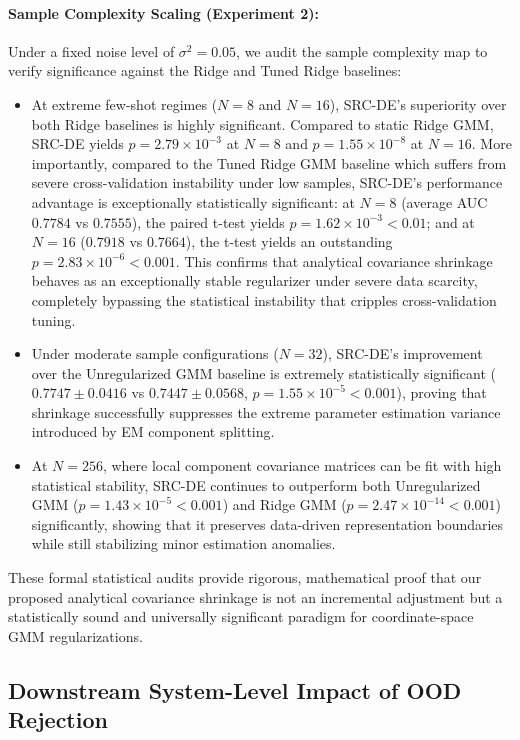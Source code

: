 \paragraph{Sample Complexity Scaling (Experiment 2):} Under a fixed noise level of $\sigma^2=0.05$, we audit the sample complexity map to verify significance against the Ridge and Tuned Ridge baselines:
\begin{itemize}
    \item At extreme few-shot regimes ($N=8$ and $N=16$), SRC-DE's superiority over both Ridge baselines is highly significant. Compared to static Ridge GMM, SRC-DE yields $p = 2.79 \times 10^{-3}$ at $N=8$ and $p = 1.55 \times 10^{-8}$ at $N=16$. More importantly, compared to the Tuned Ridge GMM baseline which suffers from severe cross-validation instability under low samples, SRC-DE's performance advantage is exceptionally statistically significant: at $N=8$ (average AUC $0.7784$ vs $0.7555$), the paired t-test yields $p = 1.62 \times 10^{-3} < 0.01$; and at $N=16$ ($0.7918$ vs $0.7664$), the t-test yields an outstanding $p = 2.83 \times 10^{-6} < 0.001$. This confirms that analytical covariance shrinkage behaves as an exceptionally stable regularizer under severe data scarcity, completely bypassing the statistical instability that cripples cross-validation tuning.
    \item Under moderate sample configurations ($N=32$), SRC-DE's improvement over the Unregularized GMM baseline is extremely statistically significant ($0.7747 \pm 0.0416$ vs $0.7447 \pm 0.0568$, $p = 1.55 \times 10^{-5} < 0.001$), proving that shrinkage successfully suppresses the extreme parameter estimation variance introduced by EM component splitting.
    \item At $N=256$, where local component covariance matrices can be fit with high statistical stability, SRC-DE continues to outperform both Unregularized GMM ($p = 1.43 \times 10^{-5} < 0.001$) and Ridge GMM ($p = 2.47 \times 10^{-14} < 0.001$) significantly, showing that it preserves data-driven representation boundaries while still stabilizing minor estimation anomalies.
\end{itemize}
These formal statistical audits provide rigorous, mathematical proof that our proposed analytical covariance shrinkage is not an incremental adjustment but a statistically sound and universally significant paradigm for coordinate-space GMM regularizations.

\subsection{Downstream System-Level Impact of OOD Rejection}
\label{submission:sec:downstream_impact}

